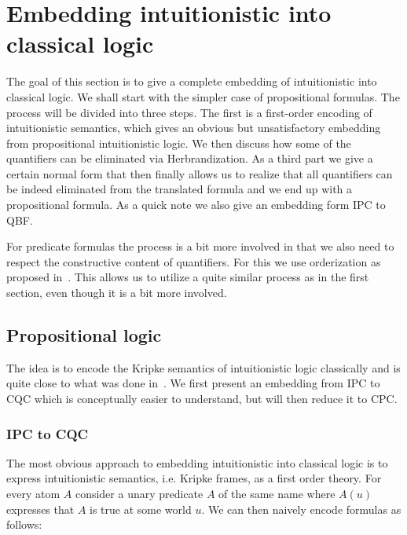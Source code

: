 \documentclass[a4paper,12pt]{report}
\theoremstyle{definition}
\theoremstyle{definition}
\theoremstyle{definition}
\theoremstyle{definition}
\theoremstyle{definition}
\theoremstyle{definition}
\theoremstyle{definition}
\begin{document}
	\chapter{Embedding intuitionistic into classical logic}
	
	The goal of this section is to give a complete embedding of intuitionistic into classical logic. We shall start with the simpler case of propositional formulas. The process will be divided into three steps. The first is a first-order encoding of intuitionistic semantics, which gives an obvious but unsatisfactory embedding from propositional intuitionistic logic. We then discuss how some of the quantifiers can be eliminated via Herbrandization. As a third part we give a certain normal form that then finally allows us to realize that all quantifiers can be indeed eliminated from the translated formula and we end up with a propositional formula. As a quick note we also give an embedding form IPC to QBF.
	
	For predicate formulas the process is a bit more involved in that we also need to respect the constructive content of quantifiers. For this we use orderization as proposed in~\cite{iemhoff2010eskolemization}. This allows us to utilize a quite similar process as in the first section, even though it is a bit more involved.
	
	\section{Propositional logic}
	
	The idea is to encode the Kripke semantics of intuitionistic logic classically and is quite close to what was done in~\cite{iemhoff2010eskolemization}. We first present an embedding from IPC to CQC which is conceptually easier to understand, but will then reduce it to CPC.
	
	\subsection{IPC to CQC}
	
	The most obvious approach to embedding intuitionistic into classical logic is to express intuitionistic semantics, i.e. Kripke frames, as a first order theory. For every atom $A$ consider a unary predicate $A$ of the same name where $A(u)$ expresses that $A$ is true at some world $u$. We can then naively encode formulas as follows:
	
\end{document}
